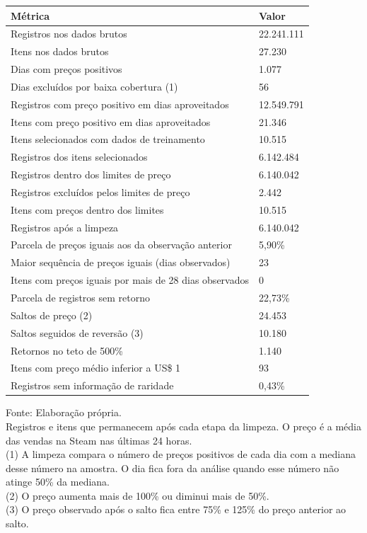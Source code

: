 \begingroup
\setlength{}
\setlength{}
\fontsize{12.0pt}{14.4pt}\selectfont

\setlength{\LTpost}{0mm}
\begin{longtable}{@{\extracolsep{\fill}}ll}

\toprule
\textbf{Métrica} & \textbf{Valor} \\ 
\midrule\addlinespace[2.5pt]
Registros nos dados brutos & 22.241.111 \\
Itens nos dados brutos & 27.230 \\
Dias com preços positivos & 1.077 \\
Dias excluídos por baixa cobertura (1) & 56 \\
Registros com preço positivo em dias aproveitados & 12.549.791 \\
Itens com preço positivo em dias aproveitados & 21.346 \\
Itens selecionados com dados de treinamento & 10.515 \\
Registros dos itens selecionados & 6.142.484 \\
Registros dentro dos limites de preço & 6.140.042 \\
Registros excluídos pelos limites de preço & 2.442 \\
Itens com preços dentro dos limites & 10.515 \\
Registros após a limpeza & 6.140.042 \\
Parcela de preços iguais aos da observação anterior & 5,90\% \\
Maior sequência de preços iguais (dias observados) & 23 \\
Itens com preços iguais por mais de 28 dias observados & 0 \\
Parcela de registros sem retorno & 22,73\% \\
Saltos de preço (2) & 24.453 \\
Saltos seguidos de reversão (3) & 10.180 \\
Retornos no teto de 500\% & 1.140 \\
Itens com preço médio inferior a US\$ 1 & 93 \\
Registros sem informação de raridade & 0,43\% \\
\bottomrule
\end{longtable}
\begin{minipage}{\linewidth}
Fonte: Elaboração própria.\\
Registros e itens que permanecem após cada etapa da limpeza. O preço é a média das vendas na Steam nas últimas 24 horas.\\
(1) A limpeza compara o número de preços positivos de cada dia com a mediana desse número na amostra. O dia fica fora da análise quando esse número não atinge 50\% da mediana.\\
(2) O preço aumenta mais de 100\% ou diminui mais de 50\%.\\
(3) O preço observado após o salto fica entre 75\% e 125\% do preço anterior ao salto.\\
\end{minipage}
\endgroup
